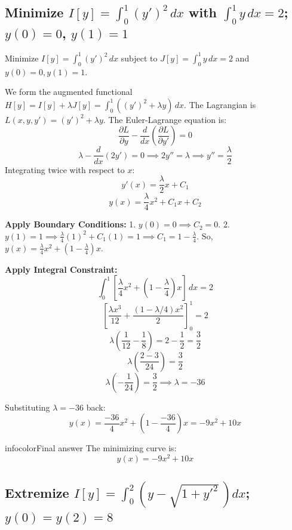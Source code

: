 \documentclass[a4paper,11pt]{article} %
\newenvironment{summarybox}[1][]{\begin{custombox}[#1]{infocolor}{Final answer}}{\end{custombox}}
\begin{document}
\subsection{\texorpdfstring{Minimize $I[y]=\int_0^1(y')^2\,dx$ with $\int_0^1 y\,dx=2$; $y(0)=0$, $y(1)=1$}{Isoperimetric problem: augment functional with Lagrange multiplier; E-L gives parabola}}

\begin{problembox}
Minimize $I[y] = \int_0^1 (y')^2 \, dx$ subject to $J[y] = \int_0^1 y \, dx = 2$
and $y(0) = 0, y(1) = 1$.
\end{problembox}

We form the augmented functional $H[y] = I[y] + \lambda J[y] = \int_0^1 ((y')^2 + \lambda y) \, dx$.
The Lagrangian is $L(x, y, y') = (y')^2 + \lambda y$.
The Euler-Lagrange equation is:
$$ \frac{\partial L}{\partial y} - \frac{d}{dx}\left(\frac{\partial L}{\partial y'}\right) = 0 $$
$$ \lambda - \frac{d}{dx}(2y') = 0 \implies 2y'' = \lambda \implies y'' = \frac{\lambda}{2} $$
Integrating twice with respect to $x$:
$$ y'(x) = \frac{\lambda}{2}x + C_1 $$
$$ y(x) = \frac{\lambda}{4}x^2 + C_1 x + C_2 $$

\textbf{Apply Boundary Conditions:}
1. $y(0) = 0 \implies C_2 = 0$.
2. $y(1) = 1 \implies \frac{\lambda}{4}(1)^2 + C_1(1) = 1 \implies C_1 = 1 - \frac{\lambda}{4}$.
So, $y(x) = \frac{\lambda}{4}x^2 + \left(1-\frac{\lambda}{4}\right)x$.

\textbf{Apply Integral Constraint:}
$$ \int_0^1 \left[\frac{\lambda}{4}x^2 + \left(1-\frac{\lambda}{4}\right)x\right] \, dx = 2 $$
$$ \left[ \frac{\lambda x^3}{12} + \frac{(1-\lambda/4)x^2}{2} \right]_0^1 = 2 $$
$$ \lambda\left(\frac{1}{12} - \frac{1}{8}\right) = 2 - \frac{1}{2} = \frac{3}{2} $$
$$ \lambda\left(\frac{2-3}{24}\right) = \frac{3}{2} $$
$$ \lambda\left(-\frac{1}{24}\right) = \frac{3}{2} \implies \lambda = -36 $$

Substituting $\lambda = -36$ back:
$$ y(x) = \frac{-36}{4}x^2 + \left(1 - \frac{-36}{4}\right)x = -9x^2 + 10x $$

\begin{summarybox}
The minimizing curve is:
$$ y(x) = -9x^2 + 10x $$
\end{summarybox}

\newpage
\subsection{\texorpdfstring{Extremize $I[y]=\int_0^2\!\left(y-\sqrt{1+y'^2}\,\right)dx$; $y(0)=y(2)=8$}{Apply Beltrami identity; ODE solves to circular arc $(x-1)^2+(y-8)^2=1$}}
\end{document}

